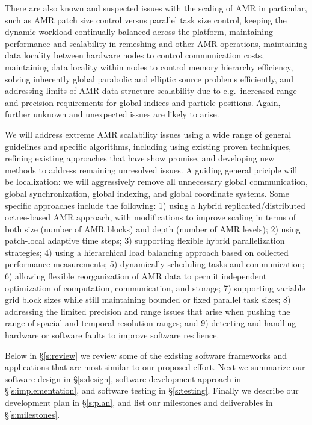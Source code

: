 \documentclass[11pt,letterpaper]{article}
\begin{document}
There are also known and suspected issues with the scaling of AMR in
particular, such as AMR patch size control versus parallel task size
control, keeping the dynamic workload continually balanced across the
platform, maintaining performance and scalability in remeshing and
other AMR operations, maintaining data locality between hardware nodes
to control communication costs, maintaining data locality within nodes
to control memory hierarchy efficiency, solving inherently global
parabolic and elliptic source problems efficiently, and addressing
limits of AMR data structure scalability due to e.g.~increased range
and precision requirements for global indices and particle positions.
Again, further unknown and unexpected issues are likely to arise.

We will address extreme AMR scalability issues using a wide range of
general guidelines and specific algorithms, including using existing
proven techniques, refining existing approaches that have show
promise, and developing new methods to address remaining unresolved
issues.  A guiding general priciple will be localization: we will
aggressively remove all unnecessary global communication, global
synchronization, global indexing, and global coordinate systems.  Some
specific approaches include the following:
%
1) using a hybrid replicated/distributed octree-based AMR approach, with
modifications to improve scaling in terms of both size (number of AMR
blocks) and depth (number of AMR levels);
% 
2) using patch-local adaptive time steps;
% 
3) supporting flexible hybrid parallelization strategies;
% 
4) using a hierarchical load balancing approach based on collected
performance measurements;
% 
5) dynamically scheduling tasks and communication;
% 
6) allowing flexible reorganization of AMR data to permit independent
optimization of computation, communication, and storage;
% 
7) supporting variable grid block sizes while still maintaining bounded
or fixed parallel task sizes;
% 
8) addressing the limited precision and range issues that arise when
pushing the range of spacial and temporal resolution ranges;
% 
and 9) detecting and handling hardware or software faults to improve
software resilience.

Below in \S\ref{s:review} we review some of the existing software
frameworks and applications that are most similar to our proposed
effort.  Next we summarize our software design in \S\ref{s:design}, software
development approach in \S\ref{s:implementation}, and software testing in
\S\ref{s:testing}.  Finally we describe our development plan in
\S\ref{s:plan}, and list our milestones and deliverables in
\S\ref{s:milestones}.
\end{document}
